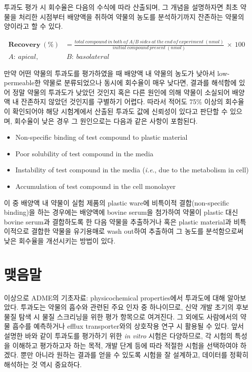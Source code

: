 \documentclass[
  11pt,
  krantz2, a4paper, twoside]{krantz}
\providecommand{\tightlist}{%
  \setlength{\itemsep}{0pt}\setlength{\parskip}{0pt}}
\begin{document}
투과도 평가 시 회수율은 다음의 수식에 따라 산출되며, 그 개념을 설명하자면 최초 약물을 처리한 시점부터 배양액을 취하여 약물의 농도를 분석하기까지 잔존하는 약물의 양이라고 할 수 있다.

\begin{equation}
\begin{split}
\mathbf{Recovery\ }\left( \mathbf{\%} \right) &= \frac{total\ compound\ in\ both\ of\ A/B\ sides\ at\ the\ end\ of\ experiment\ (nmol)}{initial\ compound\ present\ (nmol)}\  \times \ 100 \\
A:\ apical,&\ B:\ basolateral
\end{split}
\label{eq:eq02-03}
\end{equation}

만약 어떤 약물의 투과도를 평가하였을 때 배양액 내 약물의 농도가 낮아서 low-permeable한 약물로 분류되었으나 동시에 회수율이 매우 낮다면, 결과를 해석함에 있어 정말 약물의 투과도가 낮았던 것인지 혹은 다른 원인에 의해 약물이 소실되어 배양액 내 잔존하지 않았던 것인지를 구별하기 어렵다.
따라서 적어도 75\% 이상의 회수율이 확인되어야 해당 시험계에서 산출된 투과도 값에 신뢰성이 있다고 판단할 수 있으며, 회수율이 낮은 경우 그 원인으로는 다음과 같은 사항이 포함된다.

\begin{itemize}
\tightlist
\item
  Non-specific binding of test compound to plastic material
\item
  Poor solubility of test compound in the media
\item
  Instability of test compound in the media (\emph{i.e.}, due to the metabolism in cell)
\item
  Accumulation of test compound in the cell monolayer
\end{itemize}

이 중 배양액 내 약물이 실험 제품의 plastic ware에 비특이적 결합(non-specific binding)을 하는 경우에는 배양액에 bovine serum을 첨가하여 약물이 plastic 대신 bovine serum과 결합하도록 한 다음 약물을 추출하거나 혹은 plastic material과 비특이적으로 결합한 약물을 유기용매로 wash out하여 추출하여 그 농도를 분석함으로써 낮은 회수율을 개선시키는 방법이 있다.

\hypertarget{uxb9fauxc74cuxb9d0-1}{%
\section{맺음말}\label{uxb9fauxc74cuxb9d0-1}}

이상으로 ADME의 기초자료: physicochemical properties에서 투과도에 대해 알아보았다.
투과도는 약물의 흡수와 관련된 주요 인자 중 하나이므로, 신약 개발 초기의 후보물질 탐색 시 물질 스크리닝을 위한 평가 항목으로 여겨진다.
그 외에도 사람에서의 약물 흡수를 예측하거나 efflux transporter와의 상호작용 연구 시 활용될 수 있다.
앞서 설명한 바와 같이 투과도를 평가하기 위한 \emph{in vitro} 시험은 다양하므로, 각 시험의 특성을 이해하고 평가하고자 하는 목적, 개발 단계 등에 따라 적절한 시험을 선택하여야 하겠다.
뿐만 아니라 원하는 결과를 얻을 수 있도록 시험을 잘 설계하고, 데이터를 정확히 해석하는 것 역시 중요하다.
\end{document}
